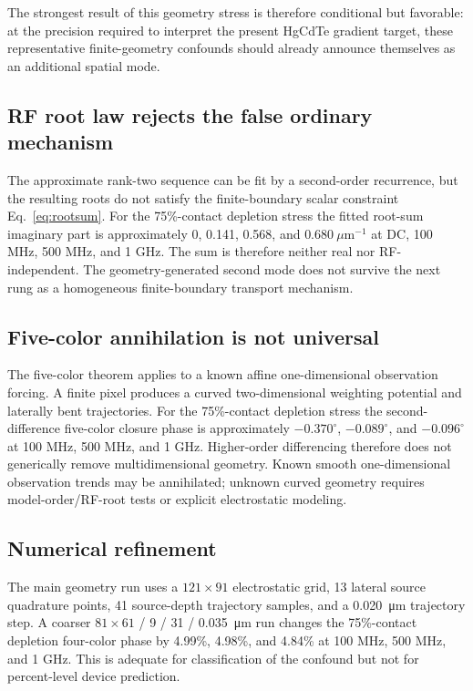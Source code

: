 \documentclass[11pt]{article}
\begin{document}
The strongest result of this geometry stress is therefore conditional but favorable: at the precision required to interpret the present HgCdTe gradient target, these representative finite-geometry confounds should already announce themselves as an additional spatial mode.

\subsection{RF root law rejects the false ordinary mechanism}
The approximate rank-two sequence can be fit by a second-order recurrence, but the resulting roots do not satisfy the finite-boundary scalar constraint Eq.~\eqref{eq:rootsum}. For the 75\%-contact depletion stress the fitted root-sum imaginary part is approximately 0, 0.141, 0.568, and $0.680\ \mu\mathrm{m}^{-1}$ at DC, 100 MHz, 500 MHz, and 1 GHz. The sum is therefore neither real nor RF-independent. The geometry-generated second mode does not survive the next rung as a homogeneous finite-boundary transport mechanism.

\subsection{Five-color annihilation is not universal}
The five-color theorem applies to a known affine one-dimensional observation forcing. A finite pixel produces a curved two-dimensional weighting potential and laterally bent trajectories. For the 75\%-contact depletion stress the second-difference five-color closure phase is approximately $-0.370^\circ$, $-0.089^\circ$, and $-0.096^\circ$ at 100 MHz, 500 MHz, and 1 GHz. Higher-order differencing therefore does not generically remove multidimensional geometry. Known smooth one-dimensional observation trends may be annihilated; unknown curved geometry requires model-order/RF-root tests or explicit electrostatic modeling.

\subsection{Numerical refinement}
The main geometry run uses a $121\times91$ electrostatic grid, 13 lateral source quadrature points, 41 source-depth trajectory samples, and a \SI{0.020}{\micro\meter} trajectory step. A coarser $81\times61$ / 9 / 31 / \SI{0.035}{\micro\meter} run changes the 75\%-contact depletion four-color phase by 4.99\%, 4.98\%, and 4.84\% at 100 MHz, 500 MHz, and 1 GHz. This is adequate for classification of the confound but not for percent-level device prediction.
\end{document}
